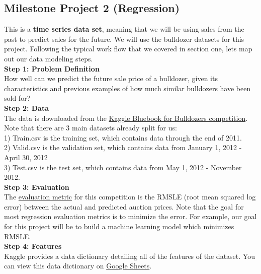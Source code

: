 \documentclass[11pt, a4paper]{article}
\begin{document}
\begin{spacing}{1.1}
	\subsection{Milestone Project 2 (Regression)}
	This is a \textbf{time series data set}, meaning that we will be using sales from the past to predict sales for the future. We will use the bulldozer datasets for this project. Following the typical work flow that we covered in section one, lets map out our data modeling steps. \vspace*{1.5mm} \\
	\textbf{Step 1: Problem Definition} \\
	How well can we predict the future sale price of a bulldozer, given its characteristics and previous examples of how much similar bulldozers have been sold for? \vspace*{1.5mm} \\
	\textbf{Step 2: Data} \\
	The data is downloaded from the \href{https://archive.ics.uci.edu/ml/datasets/heart+Disease}{Kaggle Bluebook for Bulldozers competition}. Note that there are 3 main datasets already split for us: \\
	\hspace*{2mm} 1) Train.csv is the training set, which contains data through the end of 2011. \\
	\hspace*{2mm} 2) Valid.csv is the validation set, which contains data from January 1, 2012 - April 30, 2012 \\
	\hspace*{2mm} 3) Test.csv is the test set, which contains data from May 1, 2012 - November 2012. \vspace*{1.5mm} \\
	\textbf{Step 3: Evaluation} \\
	The \href{https://www.kaggle.com/c/bluebook-for-bulldozers/overview/evaluation}{evaluation metric} for this competition is the RMSLE (root mean squared log error) between the actual and predicted auction prices. Note that the goal for most regression evaluation metrics is to minimize the error. For example, our goal for this project will be to build a machine learning model which minimizes RMSLE. \vspace*{1.5mm} \\
	\textbf{Step 4: Features} \\
	Kaggle provides a data dictionary detailing all of the features of the dataset. You can view this data dictionary on \href{https://docs.google.com/spreadsheets/d/18ly-bLR8sbDJLITkWG7ozKm8l3RyieQ2Fpgix-beSYI/edit?usp=sharing}{Google Sheets}. \vspace*{1mm}

\end{spacing}
\end{document}
